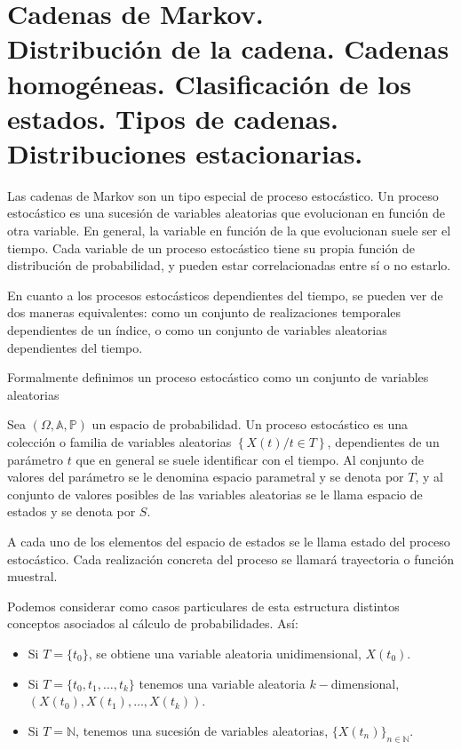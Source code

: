 \chapter[Cadenas de Markov.]{Cadenas de Markov.\\
\normalsize Distribuci\'on de la cadena. Cadenas homog\'eneas. Clasificaci\'on de los estados. Tipos de cadenas. Distribuciones estacionarias.}

Las cadenas de Markov son un tipo especial de proceso estoc\'astico. Un proceso estoc\'astico es una sucesi\'on de variables aleatorias que evolucionan en funci\'on de otra variable. En general, la variable en funci\'on de la que evolucionan suele ser el tiempo. Cada variable de un proceso estoc\'astico tiene su propia funci\'on de distribuci\'on de probabilidad, y pueden estar correlacionadas entre s\'i o no estarlo.

En cuanto a los procesos estoc\'asticos dependientes del tiempo, se pueden ver de dos maneras equivalentes: como un conjunto de realizaciones temporales dependientes de un \'indice, o como un conjunto de variables aleatorias dependientes del tiempo.

Formalmente definimos un proceso estoc\'astico como un conjunto de variables aleatorias
\begin{definicion}
Sea $\left(\Omega,\mathbb{A}, \mathbb{P}\right) $ un espacio de probabilidad. Un proceso estoc\'astico es una colecci\'on o familia de variables aleatorias $\left\{X(t)/t\in T\right\}$, dependientes de un par\'ametro $t$ que en general se suele identificar con el tiempo. Al conjunto de valores del par\'ametro se le denomina espacio parametral y se denota por $T$, y al conjunto de valores posibles de las variables aleatorias se le llama espacio de estados y se denota por $S$. 
\end{definicion}
A cada uno de los elementos del espacio de estados se le llama estado del proceso estoc\'astico. Cada realizaci\'on concreta del proceso se llamar\'a trayectoria o funci\'on muestral.

Podemos considerar como casos particulares de esta estructura distintos conceptos asociados al c\'alculo de probabilidades. As\'i:
\begin{itemize}
\item Si $T=\{t_0\}$, se obtiene una variable aleatoria unidimensional, $X(t_0)$.
\item Si $T=\{t_0, t_1, \ldots, t_k\}$ tenemos una variable aleatoria $k-$dimensional, $(X(t_0), X(t_1), \ldots, X(t_k))$.
\item Si $T=\mathbb{N}$, tenemos una sucesi\'on de variables aleatorias, $\{X(t_n)\}_{n\in\mathbb{N}}$.
\end{itemize}


